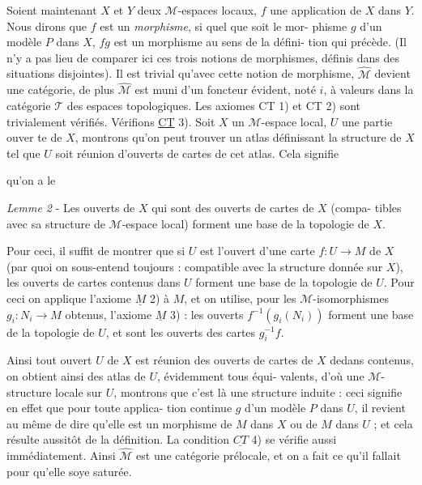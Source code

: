 Soient maintenant $X$ et $Y$ deux $\mathcal{M}$-espaces locaux, $f$ une application
de $X$ dans $Y$. Nous dirons que $f$ est un \emph{morphisme}, si quel que soit le mor-
phisme $g$ d'un modèle $P$ dans $X$, $fg$ est un morphisme au sens de la défini-
tion qui précède. (Il n'y a pas lieu de comparer ici ces trois notions
de morphismes, définis dans des situations disjointes). Il est trivial
qu'avec cette notion de morphisme, $\hat{\mathcal{M}}$ devient une catégorie, de plus $\hat{\mathcal{M}}$
est muni d'un foncteur évident, noté $i$, à valeurs dans la catégorie $\mathcal{T}$
des espaces topologiques. Les axiomes CT 1) et CT 2) sont trivialement
vérifiés. Vérifions \underline{CT} 3). Soit $X$ un $\mathcal{M}$-espace local, $U$ une partie ouver
te de $X$, montrons qu'on peut trouver un atlas définissant la structure de
$X$ tel que $U$ soit réunion d'ouverts de cartes de cet atlas. Cela signifie

\newpage



qu'on a le

\emph{Lemme 2} - Les ouverts de $X$ qui sont des ouverts de cartes de $X$ (compa-
tibles avec sa structure de $\mathcal{M}$-espace local) forment une base de la
topologie de $X$.

Pour ceci, il suffit de montrer que si $U$ est l'ouvert d'une carte
$f:U \to M$ de $X$ (par quoi on sous-entend toujours : compatible avec la
structure donnée sur $X$), les ouverts de cartes contenus dans $U$ forment
une base de la topologie de $U$. Pour ceci on applique l'axiome $\underline{M}$ 2) à $M$,
et on utilise, pour les $\mathcal{M}$-isomorphismes $g_i:N_i \to M$ obtenus, l'axiome
$\underline{M}$ 3) : les ouverts $f^{-1}(g_i(N_i))$ forment une base de la topologie de $U$,
et sont les ouverts des cartes $g_i^{-1}f$.

Ainsi tout ouvert $U$ de $X$ est réunion des ouverts de cartes de $X$
dedans contenus, on obtient ainsi des atlas de $U$, évidemment tous équi-
valents, d'où une $\mathcal{M}$-structure locale sur $U$, montrons que c'est là
une structure induite : ceci signifie en effet que pour toute applica-
tion continue $g$ d'un modèle $P$ dans $U$, il revient au même de dire qu'elle
est un morphisme de $M$ dans $X$ ou de $M$ dans $U$ ; et cela résulte aussitôt
de la définition. La condition $\underline{CT}$ 4) se vérifie aussi immédiatement.
Ainsi $\hat{\mathcal{M}}$ est une catégorie prélocale, et on a fait ce qu'il fallait
pour qu'elle soye saturée.

